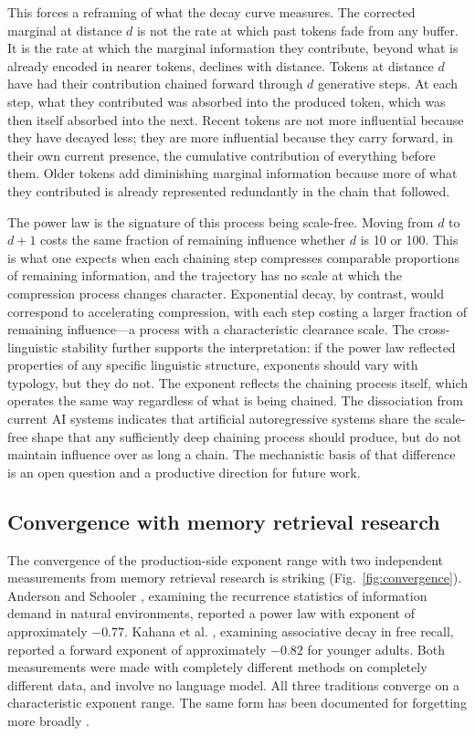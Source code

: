 \documentclass[9pt,twocolumn,twoside]{pnas-new}
\begin{document}
This forces a reframing of what the decay curve measures. The corrected marginal at distance $d$ is not the rate at which past tokens fade from any buffer. It is the rate at which the marginal information they contribute, beyond what is already encoded in nearer tokens, declines with distance. Tokens at distance $d$ have had their contribution chained forward through $d$ generative steps. At each step, what they contributed was absorbed into the produced token, which was then itself absorbed into the next. Recent tokens are not more influential because they have decayed less; they are more influential because they carry forward, in their own current presence, the cumulative contribution of everything before them. Older tokens add diminishing marginal information because more of what they contributed is already represented redundantly in the chain that followed.

The power law is the signature of this process being scale-free. Moving from $d$ to $d+1$ costs the same fraction of remaining influence whether $d$ is 10 or 100. This is what one expects when each chaining step compresses comparable proportions of remaining information, and the trajectory has no scale at which the compression process changes character. Exponential decay, by contrast, would correspond to accelerating compression, with each step costing a larger fraction of remaining influence---a process with a characteristic clearance scale. The cross-linguistic stability further supports the interpretation: if the power law reflected properties of any specific linguistic structure, exponents should vary with typology, but they do not. The exponent reflects the chaining process itself, which operates the same way regardless of what is being chained. The dissociation from current AI systems indicates that artificial autoregressive systems share the scale-free shape that any sufficiently deep chaining process should produce, but do not maintain influence over as long a chain. The mechanistic basis of that difference is an open question and a productive direction for future work.

\subsection*{Convergence with memory retrieval research}

The convergence of the production-side exponent range with two independent measurements from memory retrieval research is striking (Fig.~\ref{fig:convergence}). Anderson and Schooler \cite{anderson1991reflections}, examining the recurrence statistics of information demand in natural environments, reported a power law with exponent of approximately $-0.77$. Kahana et al. \cite{kahana2002age}, examining associative decay in free recall, reported a forward exponent of approximately $-0.82$ for younger adults. Both measurements were made with completely different methods on completely different data, and involve no language model. All three traditions converge on a characteristic exponent range. The same form has been documented for forgetting more broadly \cite{wixted1991form,rubin1996one}.
\end{document}
